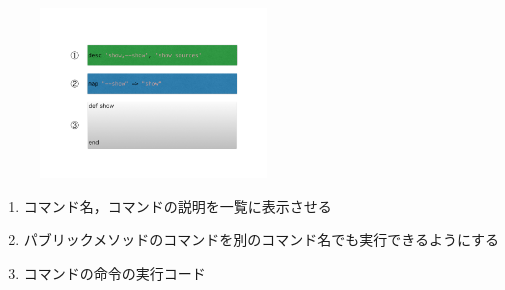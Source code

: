\begin{figure}[htbp]\begin{center}
\includegraphics[width=6cm,bb=0 0 442 500]{../figs/./hikiutils_yamane.002.jpg}
\caption{}
\label{default}\end{center}\end{figure}
\begin{enumerate}
\item コマンド名，コマンドの説明を一覧に表示させる
\item パブリックメソッドのコマンドを別のコマンド名でも実行できるようにする
\item コマンドの命令の実行コード
\end{enumerate}
